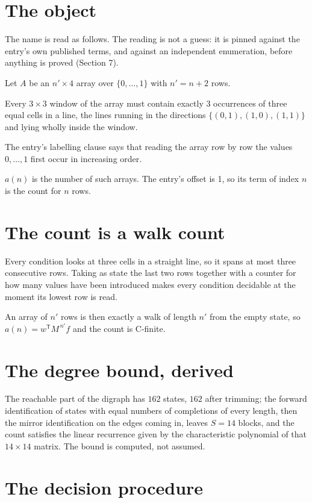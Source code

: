 \documentclass[11pt]{article}
\theoremstyle{definition}
\begin{document}
\section{The object}

The name is read as follows. The reading is not a guess: it is pinned against the entry's own published terms, and against an independent enumeration, before anything is proved (Section 7).

Let $A$ be an $n' \times 4$ array over $\{0,\dots,1\}$ with $n' = n + 2$ rows.

Every $3\times3$ window of the array must contain exactly $3$ occurrences of three equal cells in a line, the lines running in the directions $\{(0,1), (1,0), (1,1)\}$ and lying wholly inside the window.

The entry's labelling clause says that reading the array row by row the values $0,\dots,1$ first occur in increasing order.

$a(n)$ is the number of such arrays. The entry's offset is 1, so its term of index $n$ is the count for $n$ rows.

\section{The count is a walk count}

Every condition looks at three cells in a straight line, so it spans at most three consecutive rows. Taking as state the last two rows together with a counter for how many values have been introduced makes every condition decidable at the moment its lowest row is read.

An array of $n'$ rows is then exactly a walk of length $n'$ from the empty state, so $a(n) = w^{\mathsf T}M^{\,n'}f$ and the count is C-finite.

\section{The degree bound, derived}

The reachable part of the digraph has $162$ states, $162$ after trimming; the forward identification of states with equal numbers of completions of every length, then the mirror identification on the edges coming in, leaves $S = 14$ blocks, and the count satisfies the linear recurrence given by the characteristic polynomial of that $14\times14$ matrix. The bound is computed, not assumed.

\section{The decision procedure}
\end{document}
